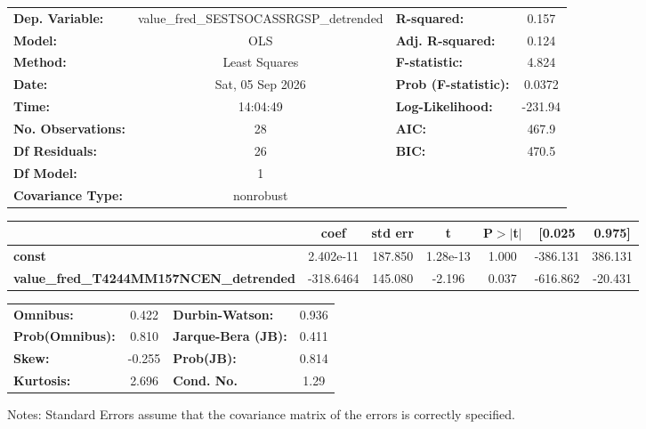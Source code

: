 \begin{center}
\begin{tabular}{lclc}
\toprule
\textbf{Dep. Variable:}                         & value\_fred\_SESTSOCASSRGSP\_detrended & \textbf{  R-squared:         } &     0.157   \\
\textbf{Model:}                                 &                  OLS                   & \textbf{  Adj. R-squared:    } &     0.124   \\
\textbf{Method:}                                &             Least Squares              & \textbf{  F-statistic:       } &     4.824   \\
\textbf{Date:}                                  &            Sat, 05 Sep 2026            & \textbf{  Prob (F-statistic):} &   0.0372    \\
\textbf{Time:}                                  &                14:04:49                & \textbf{  Log-Likelihood:    } &   -231.94   \\
\textbf{No. Observations:}                      &                     28                 & \textbf{  AIC:               } &     467.9   \\
\textbf{Df Residuals:}                          &                     26                 & \textbf{  BIC:               } &     470.5   \\
\textbf{Df Model:}                              &                      1                 & \textbf{                     } &             \\
\textbf{Covariance Type:}                       &               nonrobust                & \textbf{                     } &             \\
\bottomrule
\end{tabular}
\begin{tabular}{lcccccc}
                                                & \textbf{coef} & \textbf{std err} & \textbf{t} & \textbf{P$> |$t$|$} & \textbf{[0.025} & \textbf{0.975]}  \\
\midrule
\textbf{const}                                  &    2.402e-11  &      187.850     &  1.28e-13  &         1.000        &     -386.131    &      386.131     \\
\textbf{value\_fred\_T4244MM157NCEN\_detrended} &    -318.6464  &      145.080     &    -2.196  &         0.037        &     -616.862    &      -20.431     \\
\bottomrule
\end{tabular}
\begin{tabular}{lclc}
\textbf{Omnibus:}       &  0.422 & \textbf{  Durbin-Watson:     } &    0.936  \\
\textbf{Prob(Omnibus):} &  0.810 & \textbf{  Jarque-Bera (JB):  } &    0.411  \\
\textbf{Skew:}          & -0.255 & \textbf{  Prob(JB):          } &    0.814  \\
\textbf{Kurtosis:}      &  2.696 & \textbf{  Cond. No.          } &     1.29  \\
\bottomrule
\end{tabular}
\end{center}

Notes: \newline
 [1] Standard Errors assume that the covariance matrix of the errors is correctly specified.
